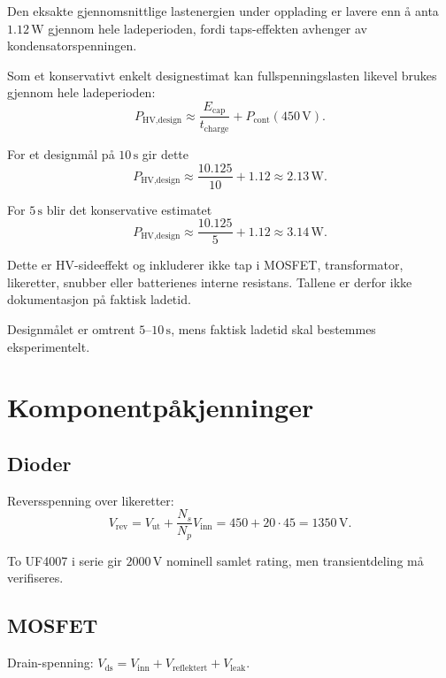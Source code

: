 \documentclass{article}
\begin{document}
Den eksakte gjennomsnittlige lastenergien under opplading er lavere enn å
anta $1.12\,\text{W}$ gjennom hele ladeperioden, fordi taps-effekten avhenger
av kondensatorspenningen.

Som et konservativt enkelt designestimat kan fullspenningslasten likevel
brukes gjennom hele ladeperioden:
\begin{equation}
P_{\text{HV,design}}
\approx
\frac{E_{\text{cap}}}{t_{\text{charge}}}
+
P_{\text{cont}}(450\,\text{V}).
\end{equation}

For et designmål på $10\,\text{s}$ gir dette
\begin{equation}
P_{\text{HV,design}}
\approx
\frac{10.125}{10}+1.12
\approx 2.13\,\text{W}.
\end{equation}

For $5\,\text{s}$ blir det konservative estimatet
\begin{equation}
P_{\text{HV,design}}
\approx
\frac{10.125}{5}+1.12
\approx 3.14\,\text{W}.
\end{equation}

Dette er HV-sideeffekt og inkluderer ikke tap i MOSFET, transformator,
likeretter, snubber eller batterienes interne resistans. Tallene er derfor
ikke dokumentasjon på faktisk ladetid.

Designmålet er omtrent $5$--$10\,\text{s}$, mens faktisk ladetid skal
bestemmes eksperimentelt.

\section{Komponentpåkjenninger}

\subsection{Dioder}
Reversspenning over likeretter:
\begin{equation}
V_{\text{rev}}
=
V_{\text{ut}}
+
\frac{N_s}{N_p}V_{\text{inn}}
=
450 + 20\cdot45
=
1350\,\text{V}.
\end{equation}

To UF4007 i serie gir $2000\,\text{V}$ nominell samlet rating, men transientdeling må verifiseres.

\subsection{MOSFET}

Drain-spenning:
$V_{\text{ds}} = V_{\text{inn}} + V_{\text{reflektert}} + V_{\text{leak}}$.
\end{document}
